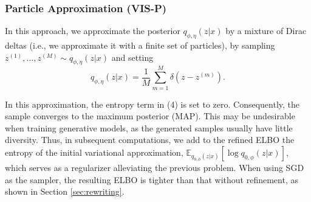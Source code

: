     \subsubsection{Particle Approximation (VIS-P)} %
    
    In this approach, we approximate the posterior $q_{\phi,\eta}(z|x)$ by a mixture of Dirac deltas (i.e., we approximate it with a finite set of particles), by sampling $z^{(1)}, \ldots, z^{(M)} \sim q_{\phi,\eta}(z|x)$ and setting 
    $$
    q_{\phi,\eta}(z|x) = \frac{1}{M} \sum_{m=1}^M \delta(z - z^{(m)}).
    $$
    
    { In this approximation, the entropy term in (4) %
    is set to zero. Consequently,  the sample converges to the 
    maximum posterior (MAP).} This may be undesirable when training generative models, as the generated samples usually have little diversity. Thus, in subsequent computations, we add to the refined ELBO the entropy of the initial variational approximation, $\mathbb{E}_{q_{0,\phi}(z|x)} \left[ \log q_{0,\phi}(z | x) \right]$, which
    serves as a regularizer alleviating the previous problem. When using SGD as the sampler, the resulting ELBO is tighter than that without refinement,
    as shown in Section \ref{sec:rewriting}. 
    
    
    
